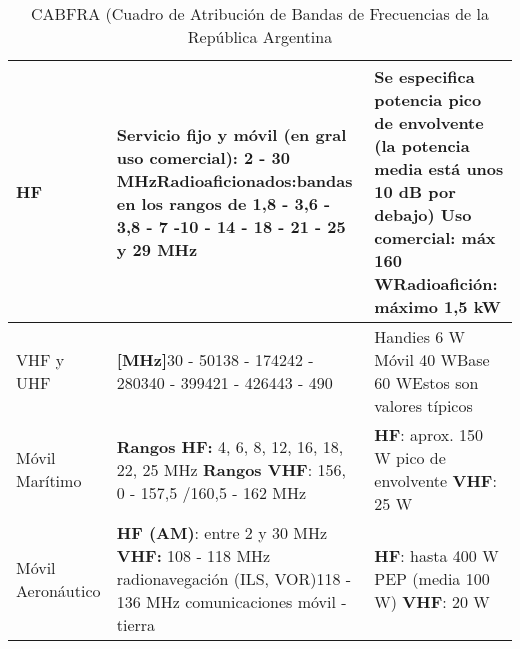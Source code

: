 \documentclass[../../labo_tp5_main.tex]{subfiles}
\begin{document}
\begin{table}[H]
\begin{tabular}{|l|L{6cm}|L{6cm}|}
\hline
HF                  & Servicio fijo y móvil (en gral uso comercial): 2 - 30 MHzRadioaficionados:bandas en los rangos de 1,8 - 3,6 - 3,8 - 7 -10 - 14 - 18 - 21 - 25 y 29 MHz                             & Se especifica potencia pico de envolvente (la potencia media está unos 10 dB por debajo) Uso comercial: máx 160 WRadioafición: máximo 1,5 kW       \\
\hline
VHF y UHF           & \textbf{{[}MHz{]}}30 - 50138 - 174242 - 280340 - 399421 - 426443 - 490                                                                                                                      & Handies 6 W Móvil 40 WBase 60 WEstos son valores típicos                                                                                           \\
\hline
Móvil Marítimo      & \textbf{Rangos HF:} 4, 6, 8, 12, 16, 18, 22, 25 MHz \textbf{Rangos VHF}: 156, 0 - 157,5 /160,5 - 162 MHz                                                                                             & \textbf{HF}: aprox. 150 W pico de envolvente \textbf{VHF}: 25 W                                                                                                      \\
\hline
Móvil Aeronáutico   & \textbf{HF (AM)}: entre 2 y 30 MHz \textbf{VHF:} 108 - 118 MHz radionavegación (ILS, VOR)118 - 136 MHz comunicaciones móvil - tierra                                                                 & \textbf{HF}: hasta 400 W PEP (media 100 W) \textbf{VHF}: 20 W\\
\hline
 
\end{tabular}

\caption{CABFRA (Cuadro de Atribuci\'on de Bandas de Frecuencias de la Rep\'ublica Argentina}
\label{tab:cabfra}
\end{table}
\end{document}

